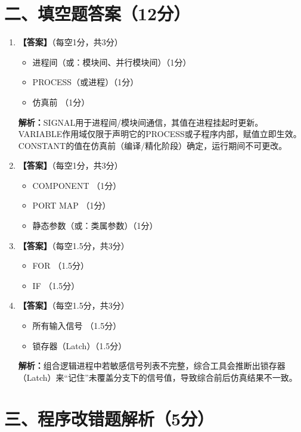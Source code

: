 \section{二、填空题答案（12分）}

\begin{enumerate}[label=\arabic*.]

\item \textbf{【答案】}（每空1分，共3分）
\begin{itemize}
  \item 进程间（或：模块间、并行模块间）\hfill（1分）
  \item PROCESS（或进程）\hfill（1分）
  \item 仿真前 \hfill（1分）
\end{itemize}
\textbf{解析：}SIGNAL用于进程间/模块间通信，其值在进程挂起时更新。VARIABLE作用域仅限于声明它的PROCESS或子程序内部，赋值立即生效。CONSTANT的值在仿真前（编译/精化阶段）确定，运行期间不可更改。

\item \textbf{【答案】}（每空1分，共3分）
\begin{itemize}
  \item COMPONENT \hfill（1分）
  \item PORT MAP \hfill（1分）
  \item 静态参数（或：类属参数）\hfill（1分）
\end{itemize}

\item \textbf{【答案】}（每空1.5分，共3分）
\begin{itemize}
  \item FOR \hfill（1.5分）
  \item IF \hfill（1.5分）
\end{itemize}

\item \textbf{【答案】}（每空1.5分，共3分）
\begin{itemize}
  \item 所有输入信号 \hfill（1.5分）
  \item 锁存器（Latch）\hfill（1.5分）
\end{itemize}
\textbf{解析：}组合逻辑进程中若敏感信号列表不完整，综合工具会推断出锁存器（Latch）来“记住”未覆盖分支下的信号值，导致综合前后仿真结果不一致。

\end{enumerate}

\section{三、程序改错题解析（5分）}

